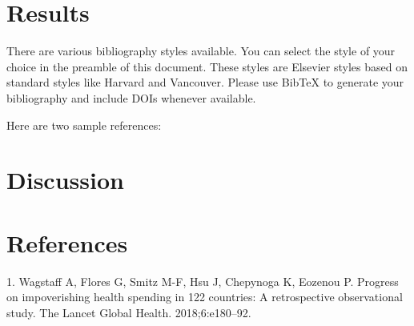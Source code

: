 \documentclass[]{elsarticle} %
\begin{document}
\hypertarget{results}{%
\section{Results}\label{results}}

There are various bibliography styles available. You can select the
style of your choice in the preamble of this document. These styles are
Elsevier styles based on standard styles like Harvard and Vancouver.
Please use BibTeX to generate your bibliography and include DOIs
whenever available.

Here are two sample references:

\hypertarget{discussion}{%
\section{Discussion}\label{discussion}}

\hypertarget{references}{%
\section*{References}\label{references}}

\hypertarget{refs}{}
\leavevmode\hypertarget{ref-wagstaff2018progress}{}%
1. Wagstaff A, Flores G, Smitz M-F, Hsu J, Chepynoga K, Eozenou P. Progress on impoverishing health spending in 122 countries: A retrospective observational study. The Lancet Global Health. 2018;6:e180--92.
\end{document}
